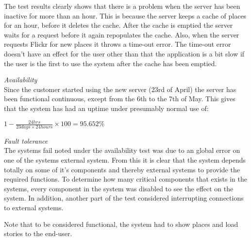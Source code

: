 The test results clearly shows that there is a problem when the server has been inactive for more than an hour. This is because the server keeps a cache of places for an hour, before it deletes the cache. After the cache is emptied the server waits for a request before it again repopulates the cache. Also, when the server requests Flickr for new places it throws a time-out error. The time-out error doesn't have an effect for the user other than that the application is a bit slow if the user is the first to use the system after the cache has been emptied.

\emph{Availability}\\
Since the customer started using the new server (23rd of April) the server has been functional continuous, except from the 6th to the 7th of May. This gives that the system has had an uptime under presumably normal use of:

$1-\frac{24 hrs}{23 days \times 24 hours} \times 100 = 95.652 \% $

\emph{Fault tolerance}\\
The systems fail noted under the availability test was due to an global error on one of the systems external system. From this it is clear that the system depends totally on some of it's components and thereby external systems to provide the required functions. To determine how many critical components that exists in the systems, every component in the system was disabled to see the effect on the system. In addition, another part of the test considered interrupting connections to external systems. 

Note that to be considered functional, the system had to show places and load stories to the end-user. 

